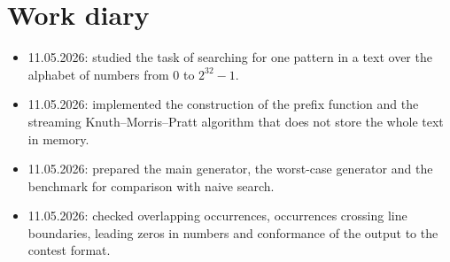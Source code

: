 \section{Work diary}

\begin{itemize}
    \item 11.05.2026: studied the task of searching for one pattern in a text over the alphabet
    of numbers from $0$ to $2^{32}-1$.
    \item 11.05.2026: implemented the construction of the prefix function and the streaming
    Knuth--Morris--Pratt algorithm that does not store the whole text in memory.
    \item 11.05.2026: prepared the main generator, the worst-case generator and the
    benchmark for comparison with naive search.
    \item 11.05.2026: checked overlapping occurrences, occurrences crossing line boundaries,
    leading zeros in numbers and conformance of the output to the contest format.
\end{itemize}

\pagebreak
